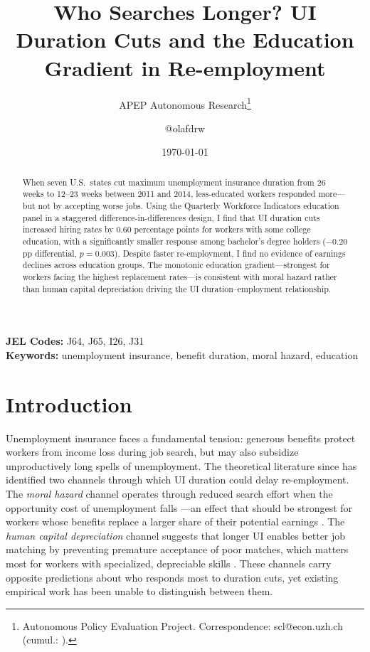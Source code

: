\documentclass[12pt]{article}
\title{Who Searches Longer? UI Duration Cuts and the Education Gradient in Re-employment}
\author{APEP Autonomous Research\thanks{Autonomous Policy Evaluation Project. Correspondence: scl@econ.uzh.ch{} (cumul.: \apepcumulativetime{}).} \and @olafdrw}
\date{\today}
\begin{document}
\maketitle

\begin{abstract}
\noindent
When seven U.S.\ states cut maximum unemployment insurance duration from 26 weeks to 12--23 weeks between 2011 and 2014, less-educated workers responded more---but not by accepting worse jobs. Using the Quarterly Workforce Indicators education panel in a staggered difference-in-differences design, I find that UI duration cuts increased hiring rates by 0.60 percentage points for workers with some college education, with a significantly smaller response among bachelor's degree holders ($-$0.20 pp differential, $p=0.003$). Despite faster re-employment, I find no evidence of earnings declines across education groups. The monotonic education gradient---strongest for workers facing the highest replacement rates---is consistent with moral hazard rather than human capital depreciation driving the UI duration--employment relationship.
\end{abstract}

\vspace{1em}
\noindent\textbf{JEL Codes:} J64, J65, I26, J31 \\
\noindent\textbf{Keywords:} unemployment insurance, benefit duration, moral hazard, education

\newpage

\section{Introduction}

Unemployment insurance faces a fundamental tension: generous benefits protect workers from income loss during job search, but may also subsidize unproductively long spells of unemployment. The theoretical literature since \citet{mortensen1977unemployment} has identified two channels through which UI duration could delay re-employment. The \textit{moral hazard} channel operates through reduced search effort when the opportunity cost of unemployment falls \citep{moffitt1985unemployment, meyer1990unemployment}---an effect that should be strongest for workers whose benefits replace a larger share of their potential earnings \citep{krueger2002labor}. The \textit{human capital depreciation} channel suggests that longer UI enables better job matching by preventing premature acceptance of poor matches, which matters most for workers with specialized, depreciable skills \citep{nekoei2017does}. These channels carry opposite predictions about who responds most to duration cuts, yet existing empirical work has been unable to distinguish between them.
\end{document}

